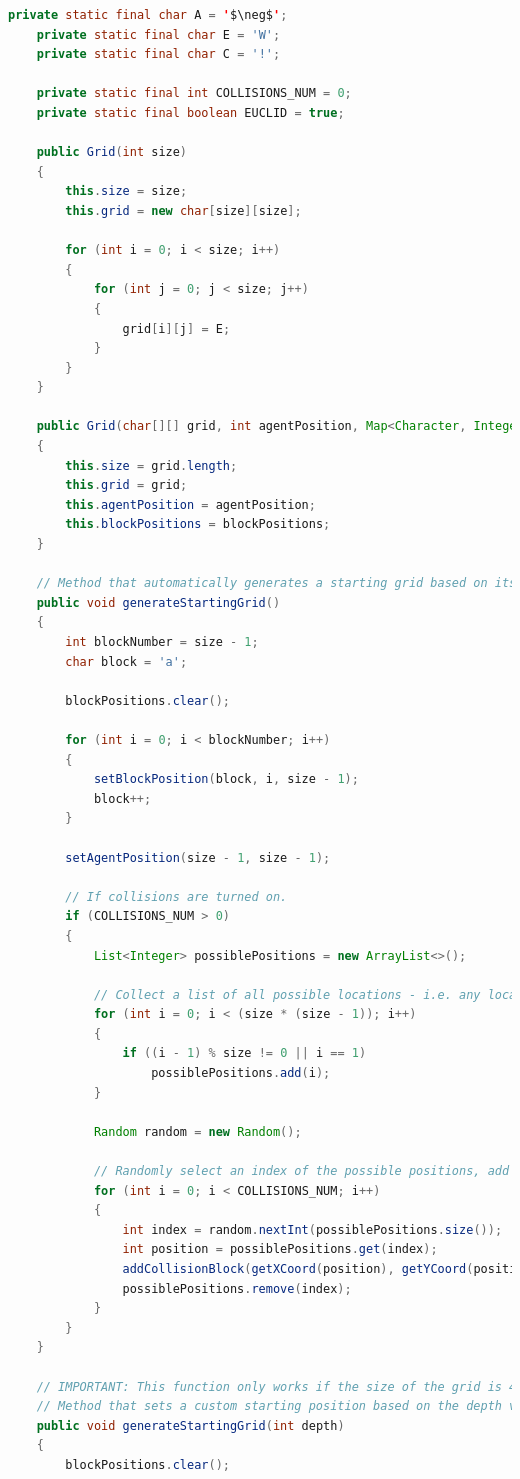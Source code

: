 \documentclass{article}
\begin{document}
\begin{appendices}
\begin{lstlisting}[language=Java,mathescape=true]
	private static final char A = '$\neg$';
	private static final char E = 'W';
	private static final char C = '!';
	
	private static final int COLLISIONS_NUM = 0;
	private static final boolean EUCLID = true;
	
	public Grid(int size)
	{
		this.size = size;
		this.grid = new char[size][size];
	
		for (int i = 0; i < size; i++)
		{
			for (int j = 0; j < size; j++)
			{
				grid[i][j] = E;
			}
		}
	}

	public Grid(char[][] grid, int agentPosition, Map<Character, Integer> blockPositions)
	{
		this.size = grid.length;
		this.grid = grid;
		this.agentPosition = agentPosition;
		this.blockPositions = blockPositions;
	}

	// Method that automatically generates a starting grid based on its size.
	public void generateStartingGrid()
	{
		int blockNumber = size - 1;
		char block = 'a';

		blockPositions.clear();

		for (int i = 0; i < blockNumber; i++)
		{
			setBlockPosition(block, i, size - 1);
			block++;
		}

		setAgentPosition(size - 1, size - 1);

		// If collisions are turned on.
		if (COLLISIONS_NUM > 0)
		{
			List<Integer> possiblePositions = new ArrayList<>();

			// Collect a list of all possible locations - i.e. any location that is not needed for the agent and blocks in the start state, or the blocks in the solution state.
			for (int i = 0; i < (size * (size - 1)); i++)
			{
				if ((i - 1) % size != 0 || i == 1)
					possiblePositions.add(i);
			}

			Random random = new Random();

			// Randomly select an index of the possible positions, add the collision block, and then remove it from the index.
			for (int i = 0; i < COLLISIONS_NUM; i++)
			{
				int index = random.nextInt(possiblePositions.size());
				int position = possiblePositions.get(index);
				addCollisionBlock(getXCoord(position), getYCoord(position));
				possiblePositions.remove(index);
			}
		}
	}

	// IMPORTANT: This function only works if the size of the grid is 4x4, i.e. size = 4.
	// Method that sets a custom starting position based on the depth value provided.
	public void generateStartingGrid(int depth)
	{
		blockPositions.clear();


\end{lstlisting}
\end{appendices}
\end{document}
